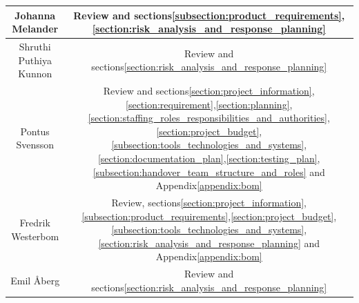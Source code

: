\begin{table}[H]
\begin{tabular}{|c|c|}
        Johanna Melander        & Review and sections\:\ref{subsection:product_requirements},\ref{section:risk_analysis_and_response_planning}                                                                                       \\ \hline
        Shruthi Puthiya Kunnon  & Review and sections\:\ref{section:risk_analysis_and_response_planning}                                                                                        \\ \hline
        Pontus Svensson         & Review and sections\:\ref{section:project_information},\ref{section:requirement},\ref{section:planning},\ref{section:staffing_roles_responsibilities_and_authorities},\ref{section:project_budget},\ref{subsection:tools_technologies_and_systems},\ref{section:documentation_plan},\ref{section:testing_plan},\ref{subsection:handover_team_structure_and_roles} and Appendix\:\ref{appendix:bom}                          \\ \hline
        Fredrik Westerbom       & Review, sections\:\ref{section:project_information},\ref{subsection:product_requirements},\ref{section:project_budget},\ref{subsection:tools_technologies_and_systems},\ref{section:risk_analysis_and_response_planning} and Appendix\:\ref{appendix:bom}                                                                                                                                                                                     \\ \hline
        Emil Åberg              & Review and sections\:\ref{section:risk_analysis_and_response_planning}                                                                                        \\ \hline
    \end{tabular}
\end{table}


